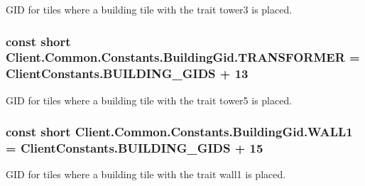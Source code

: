 G\+I\+D for tiles where a building tile with the trait tower3 is placed. 

\hypertarget{classClient_1_1Common_1_1Constants_1_1BuildingGid_a92b294404ddf43444c7371a39983d120}{}
\subsubsection[{T\+R\+A\+N\+S\+F\+O\+R\+M\+E\+R}]{\setlength{\rightskip}{0pt plus 5cm}const short Client.\+Common.\+Constants.\+Building\+Gid.\+T\+R\+A\+N\+S\+F\+O\+R\+M\+E\+R = {\bf Client\+Constants.\+B\+U\+I\+L\+D\+I\+N\+G\+\_\+\+G\+I\+D\+S} + 13}\label{classClient_1_1Common_1_1Constants_1_1BuildingGid_a92b294404ddf43444c7371a39983d120}


G\+I\+D for tiles where a building tile with the trait tower5 is placed. 

\hypertarget{classClient_1_1Common_1_1Constants_1_1BuildingGid_ab28e3c37a26afe3ce15089598a679735}{}
\subsubsection[{W\+A\+L\+L1}]{\setlength{\rightskip}{0pt plus 5cm}const short Client.\+Common.\+Constants.\+Building\+Gid.\+W\+A\+L\+L1 = {\bf Client\+Constants.\+B\+U\+I\+L\+D\+I\+N\+G\+\_\+\+G\+I\+D\+S} + 15}\label{classClient_1_1Common_1_1Constants_1_1BuildingGid_ab28e3c37a26afe3ce15089598a679735}


G\+I\+D for tiles where a building tile with the trait wall1 is placed. 

\hypertarget{classClient_1_1Common_1_1Constants_1_1BuildingGid_aa10dd7a207483d0b637866d7efdaca88}{}
